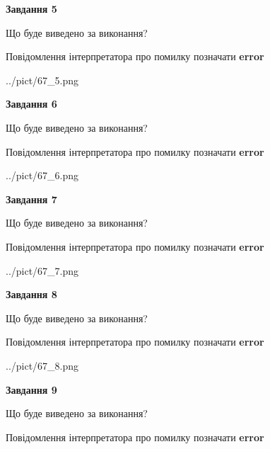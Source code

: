 \documentclass[11pt, ukrainian]{article}
\begin{document}
{\begin {large}
{\begin {center}\textbf{Завдання 5}\end {center}}\par
Що буде виведено за виконання? \par
Повідомлення інтерпретатора про помилку позначати \textbf{error}

\begin{center}
	{../pict/67_5.png}
\end{center}
\newpage

{\begin {center}\textbf{Завдання 6}\end {center}}\par
Що буде виведено за виконання? \par
Повідомлення інтерпретатора про помилку позначати \textbf{error}

\begin{center}
	{../pict/67_6.png}
\end{center}
\newpage

{\begin {center}\textbf{Завдання 7}\end {center}}\par
Що буде виведено за виконання? \par
Повідомлення інтерпретатора про помилку позначати \textbf{error}

\begin{center}
	{../pict/67_7.png}
\end{center}
\newpage

{\begin {center}\textbf{Завдання 8}\end {center}}\par
Що буде виведено за виконання? \par
Повідомлення інтерпретатора про помилку позначати \textbf{error}

\begin{center}
	{../pict/67_8.png}
\end{center}
\newpage

{\begin {center}\textbf{Завдання 9}\end {center}}\par
Що буде виведено за виконання? \par
Повідомлення інтерпретатора про помилку позначати \textbf{error}


\end{large}}
\end{document}
